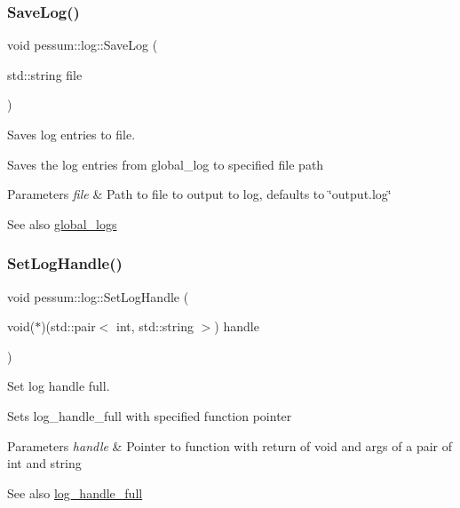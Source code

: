 \subsubsection{\texorpdfstring{Save\+Log()}{SaveLog()}}
{\footnotesize\ttfamily void pessum\+::log\+::\+Save\+Log (\begin{DoxyParamCaption}\item[{std\+::string}]{file }\end{DoxyParamCaption})}



Saves log entries to file. 

Saves the log entries from global\+\_\+log to specified file path 
\begin{DoxyParams}{Parameters}
{\em file} & Path to file to output to log, defaults to \char`\"{}output.\+log\char`\"{} \\
\hline
\end{DoxyParams}
\begin{DoxySeeAlso}{See also}
\hyperlink{namespacepessum_1_1log_a8a1cb7b63dbf69c0f4c6c155e09ea5c1}{global\+\_\+logs} 
\end{DoxySeeAlso}
\mbox{\label{namespacepessum_1_1log_a3dad780e9e79cf9184fcaaed11b30745}} 
\subsubsection{\texorpdfstring{Set\+Log\+Handle()}{SetLogHandle()}\hspace{0.1cm}{\footnotesize\ttfamily [1/2]}}
{\footnotesize\ttfamily void pessum\+::log\+::\+Set\+Log\+Handle (\begin{DoxyParamCaption}\item[{void($\ast$)(std\+::pair$<$ int, std\+::string $>$)}]{handle }\end{DoxyParamCaption})}



Set log handle full. 

Sets log\+\_\+handle\+\_\+full with specified function pointer 
\begin{DoxyParams}{Parameters}
{\em handle} & Pointer to function with return of void and args of a pair of int and string \\
\hline
\end{DoxyParams}
\begin{DoxySeeAlso}{See also}
\hyperlink{namespacepessum_1_1log_aa25914cc49048e5934cd41f86e74390f}{log\+\_\+handle\+\_\+full} 
\end{DoxySeeAlso}
\mbox{\label{namespacepessum_1_1log_a4a1f2b59bfce86460538cee3b29d1d1f}} 
